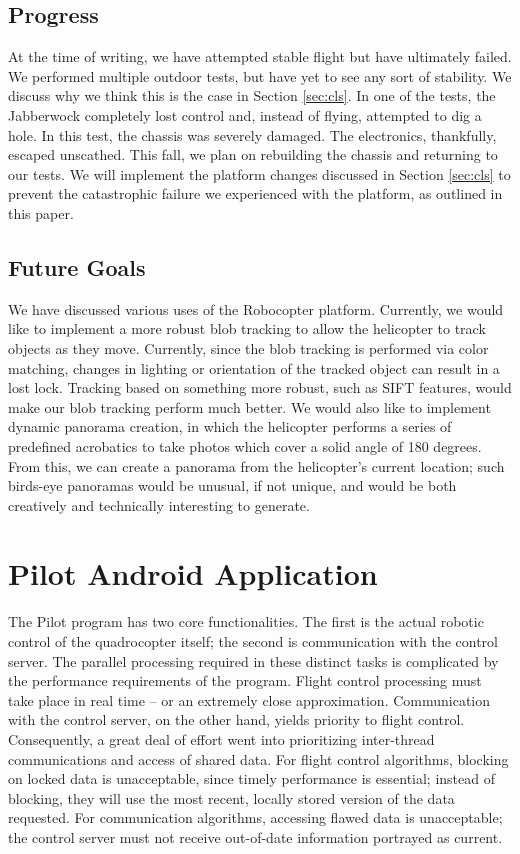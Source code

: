 \documentclass[letterpaper]{article}
\begin{document}
\subsection{Progress}
At the time of writing, we have attempted stable flight but have
ultimately failed. We performed multiple outdoor tests, but have yet to
see any sort of stability. We discuss why we think this is the case in
Section \ref{sec:cls}. In one of the tests, the Jabberwock completely
lost control and, instead of flying, attempted to dig a hole. In this
test, the chassis was severely damaged. The electronics, thankfully,
escaped unscathed. This fall, we plan on rebuilding the chassis and
returning to our tests.  We will implement the platform changes
discussed in Section \ref{sec:cls} to prevent the catastrophic failure
we experienced with the platform, as outlined in this paper.

\subsection{Future Goals}
We have discussed various uses of the Robocopter platform. Currently,
we would like to implement a more robust blob tracking to allow the
helicopter to track objects as they move. Currently, since the blob
tracking is performed via color matching, changes in lighting or
orientation of the tracked object can result in a lost lock. Tracking
based on something more robust, such as SIFT features, would make our
blob tracking perform much better.  We would also like to implement
dynamic panorama creation, in which the helicopter performs a series
of predefined acrobatics to take photos which cover a solid angle of
180 degrees. From this, we can create a panorama from the helicopter's
current location; such birds-eye panoramas would be unusual, if not
unique, and would be both creatively and technically interesting to
generate.

\section{Pilot Android Application}
\label{sec:pilot}
The Pilot program has two core functionalities. The first is the
actual robotic control of the quadrocopter itself; the second is
communication with the control server. The parallel processing
required in these distinct tasks is complicated by the performance
requirements of the program. Flight control processing must take place
in real time -- or an extremely close approximation. Communication
with the control server, on the other hand, yields priority to flight
control. Consequently, a great deal of effort went into prioritizing
inter-thread communications and access of shared data. For flight
control algorithms, blocking on locked data is unacceptable, since
timely performance is essential; instead of blocking, they will use
the most recent, locally stored version of the data requested. For
communication algorithms, accessing flawed data is unacceptable; the
control server must not receive out-of-date information portrayed as
current.
\end{document}

